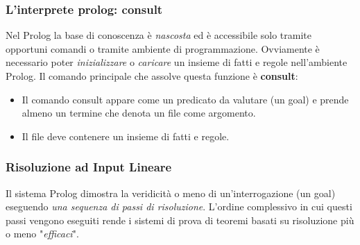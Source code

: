 \documentclass[11pt]{article}
\begin{document}
\subsubsection{L'interprete prolog: \textbf{consult}}
Nel Prolog la base di conoscenza è \textit{nascosta} ed è accessibile solo tramite opportuni comandi o tramite ambiente di programmazione. Ovviamente è necessario poter \emph{inizializzare} o \emph{caricare} un insieme di fatti e regole nell'ambiente Prolog.
Il comando principale che assolve questa funzione è \textbf{consult}:
\begin{itemize}
	\item Il comando consult appare come un predicato da valutare (un goal) e prende
almeno un termine che denota un file come argomento.
	\item Il file deve contenere un insieme di fatti e regole.
\end{itemize}

\subsubsection{Risoluzione ad Input Lineare}
Il sistema Prolog dimostra la veridicità o meno di un'interrogazione (un goal) eseguendo \textit{una sequenza di passi di risoluzione}. L'ordine complessivo in cui questi passi vengono eseguiti rende i sistemi di prova di teoremi basati su risoluzione più o meno "\emph{efficaci}".
\end{document}
